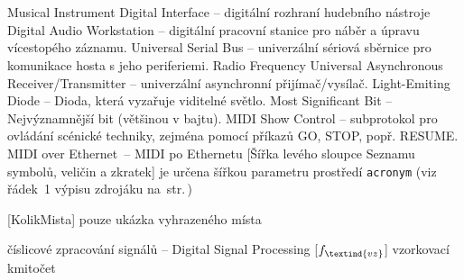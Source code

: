 \cleardoublepage
\chapter*{\listofabbrevname}
{}

\begin{acronym}[KolikMista]
        {Musical Instrument Digital Interface -- digitální rozhraní hudebního nástroje}
        {Digital Audio Workstation -- digitální pracovní stanice pro náběr a úpravu vícestopého záznamu.}
        {Universal Serial Bus -- univerzální sériová sběrnice pro komunikace hosta s jeho periferiemi.}
        {Radio Frequency}
        {Universal Asynchronous Receiver/Transmitter -- univerzální asynchronní přijímač/vysílač.}
        {Light-Emiting Diode -- Dioda, která vyzařuje viditelné světlo.}
        {Most Significant Bit -- Nejvýznamnější bit (většinou v bajtu).}
        {\acs{MIDI} Show Control -- subprotokol pro ovládání scénické techniky, zejména pomocí příkazů GO, STOP, popř. RESUME.}
        {\acs{MIDI} over Ethernet~-- \acs{MIDI} po Ethernetu}
		[Šířka levého sloupce Seznamu symbolů, veličin a zkratek]								%
		{je určena šířkou parametru prostředí \texttt{acronym} (viz řádek~1 výpisu zdrojáku na~str.\,\pageref{lst:zkratky})}

		[KolikMista]
		{pouze ukázka vyhrazeného místa}

		{číslicové zpracování signálů -- Digital Signal Processing}
		[\ensuremath{f_\textind{vz}}] %
		{vzorkovací kmitočet}					%

\end{acronym}
